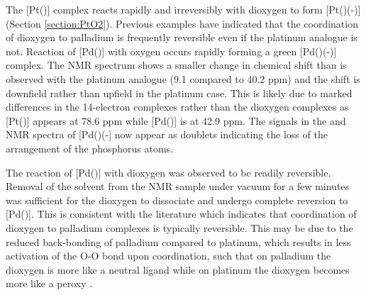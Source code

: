 The [Pt(\tButhixantphos)] complex reacts rapidly and irreversibly with dioxygen to form [Pt(\tButhixantphos)(-)] (Section \ref{section:PtO2}).  Previous examples have indicated that the coordination of dioxygen to palladium is frequently reversible even if the platinum analogue is not.\cite{Yoshida1979}  Reaction of [Pd(\tButhixantphos)] with oxygen occurs rapidly forming a green [Pd(\tButhixantphos)(-)] complex.  The \phosphorus{} NMR spectrum shows a smaller change in chemical shift than is observed with the platinum analogue (9.1 compared to 40.2 ppm) and the shift is downfield rather than upfield in the platinum case.  This is likely due to marked differences in the 14-electron complexes rather than the dioxygen complexes as [Pt(\tButhixantphos)] appears at 78.6 ppm while [Pd(\tButhixantphos)] is at 42.9 ppm.  The \tBu{} signals in the \proton{} and \carbon{} NMR spectra of [Pd(\tButhixantphos)(-] now appear as doublets indicating the loss of the \trans{} arrangement of the phosphorus atoms.  

The reaction of [Pd(\tButhixantphos)] with dioxygen was observed to be readily reversible.  Removal of the solvent from the NMR sample under vacuum for a few minutes was sufficient for the dioxygen to dissociate and undergo complete reversion to [Pd(\tButhixantphos)].  This is consistent with the literature which indicates that coordination of dioxygen to palladium complexes is typically reversible.\cite{Yoshida1979}  This may be due to the reduced back-bonding of palladium compared to platinum, which results in less activation of the O-O bond upon coordination, such that on palladium the dioxygen is more like a neutral  ligand while on platinum the dioxygen becomes more like a peroxy .  


